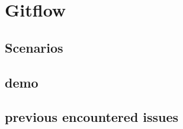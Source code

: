 

\section{Gitflow}
	

	\subsection{Scenarios}
	

	\subsection{demo}
	

	\subsection{previous encountered issues}
	
	
